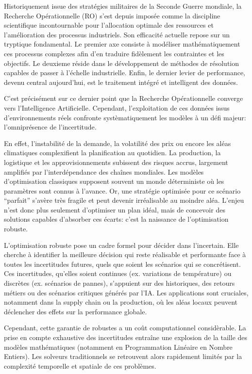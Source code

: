 \documentclass[12pt, a4paper, twoside]{report}
\begin{document}
Historiquement issue des stratégies militaires de la Seconde Guerre mondiale, la Recherche Opérationnelle (RO) s'est depuis imposée comme la discipline scientifique incontournable pour l'allocation optimale des ressources et l'amélioration des processus industriels.
Son efficacité actuelle repose sur un tryptique fondamental. Le premier axe consiste à modéliser mathématiquement ces processus complexes afin d'en traduire fidèlement les contraintes et les objectifs.
Le deuxieme réside dans le développement de méthodes de résolution capables de passer à l'échelle industrielle. Enfin, le dernier levier de performance, devenu central aujourd'hui, est le traitement intégré et intelligent des données.

C'est précisément sur ce dernier point que la Recherche Opérationnelle converge vers l'Intelligence Artificielle. Cependant, l'exploitation de ces données issus d'environnements réels confronte systèmatiquement les modèles à un défi majeur: l'omniprésence de l'incertitude.

En effet, l'instabilité de la demande, la volatilité des prix ou encore les aléas climatiques complexifient la planification au quotidien. La production, la logistique et les approvisionnements subissent des risques accrus, largement amplifiés par l'interdépendance des chaînes mondiales.
Les modèles d'optimisation classiques supposent souvent un monde déterministe où les paramètres sont connus à l'avance. Or, une stratégie optimisée pour ce scénario ``parfait'' s'avère très fragile et peut devenir irréalisable au moindre aléa.
L'enjeu n'est donc plus seulement d'optimiser un plan idéal, mais de concevoir des solutions capables d'absorber ces écarts: c'est la naissance de l'optimisation robuste.

L'optimisation robuste pose un cadre formel pour décider dans l'incertain. Elle cherche à identifier la meilleure décision qui reste réalisable et performante face à toutes les incertitudes futures, quels que soient les scénarios qui se concrétisent.
Ces incertitudes, qu'elles soient continues (ex. variations de température) ou discrètes (ex. scénarios de pannes), s'appuient sur des historiques, des retours métiers ou des scénarios critiques générés par l'IA.
Les applications sont cruciales, notamment dans la supply chain ou la production, où les aléas locaux peuvent déclencher des effets sur la performance globale.

Cependant, cette garantie de robustes a un coût computationnel considèrable. La prise en compte exhaustive des incertitudes entraîne une explosion de la taille des modèles mathématiques (notamment en Programmation Linéaire en Nombre Entiers).
Les solveurs traditionnels se retrouvent alors rapidement limités par la complexité temporelle et spatiale de ces problèmes.
\end{document}
